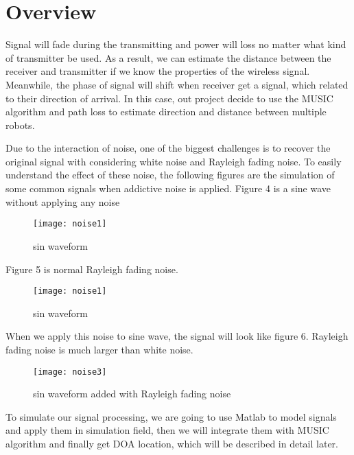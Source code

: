 
\section{Overview}
\label{sec:overview}
	Signal will fade during the transmitting and power will loss no matter what kind of transmitter be used. As a result, we can estimate the distance between the receiver and transmitter if we know the properties of the wireless signal. Meanwhile, the phase of signal will shift when receiver get a signal, which related to their direction of arrival. In this case, out project decide to use the MUSIC algorithm and path loss to estimate direction and distance between multiple robots.
\par
	Due to the interaction of noise, one of the biggest challenges is to recover the original signal with considering white noise and Rayleigh fading noise. To easily understand the effect of these noise, the following figures are the simulation of some common signals when addictive noise is applied. Figure 4 is a sine wave without applying any noise 
\begin{figure}[ht]
	\centering
	\texttt{[image: noise1]}
	\caption{sin waveform}
	\end{figure}	
\par	
Figure 5 is normal Rayleigh fading noise. \\
	\begin{figure}[ht]
	\centering
	\texttt{[image: noise1]}
	\caption{sin waveform}
	\end{figure}
\par
	When we apply this noise to sine wave, the signal will look like figure 6. Rayleigh fading noise is much larger than white noise.  		

	\begin{figure}[ht]
	\centering
	\texttt{[image: noise3]}
	\caption{sin waveform added with Rayleigh fading noise}
	\end{figure}
	
	
	
	
	\par
	To simulate our signal processing, we are going to use Matlab to model signals and apply them in simulation field, then we will integrate them with MUSIC algorithm and finally get DOA location, which will be described in detail later. 


